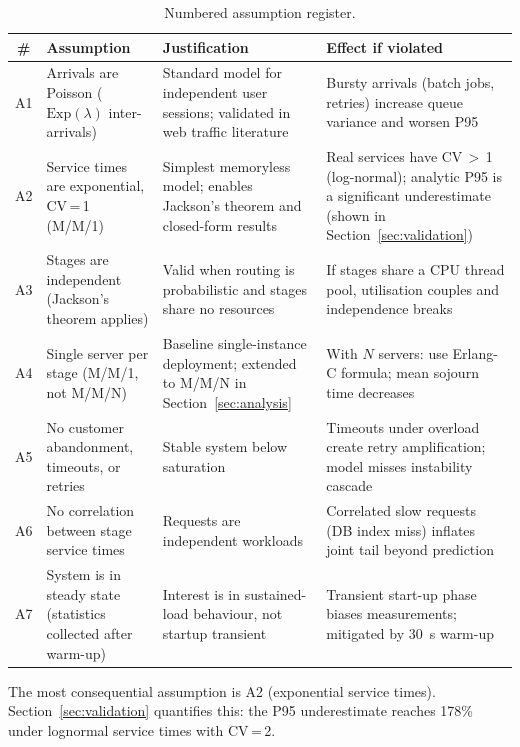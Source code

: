 \documentclass[12pt,a4paper]{article}
\newcommand{\Exp}[1]{\mathrm{Exp}(#1)}
\begin{document}
\begin{table}[H]
\centering
\caption{Numbered assumption register.}
\label{tab:assumptions}
\small
\begin{tabular}{cp{4.4cm}p{3.6cm}p{3.8cm}}
\toprule
\# & Assumption & Justification & Effect if violated \\
\midrule
A1 & Arrivals are Poisson ($\Exp{\lambda}$ inter-arrivals) &
     Standard model for independent user sessions; validated in web traffic literature &
     Bursty arrivals (batch jobs, retries) increase queue variance and worsen P95 \\[4pt]
A2 & Service times are exponential, CV\,=\,1 (M/M/1) &
     Simplest memoryless model; enables Jackson's theorem and closed-form results &
     Real services have CV\,$>$\,1 (log-normal); analytic P95 is a significant
     underestimate (shown in Section~\ref{sec:validation}) \\[4pt]
A3 & Stages are independent (Jackson's theorem applies) &
     Valid when routing is probabilistic and stages share no resources &
     If stages share a CPU thread pool, utilisation couples and independence breaks \\[4pt]
A4 & Single server per stage (M/M/1, not M/M/N) &
     Baseline single-instance deployment; extended to M/M/N in Section~\ref{sec:analysis} &
     With $N$ servers: use Erlang-C formula; mean sojourn time decreases \\[4pt]
A5 & No customer abandonment, timeouts, or retries &
     Stable system below saturation &
     Timeouts under overload create retry amplification; model misses instability cascade \\[4pt]
A6 & No correlation between stage service times &
     Requests are independent workloads &
     Correlated slow requests (DB index miss) inflates joint tail beyond prediction \\[4pt]
A7 & System is in steady state (statistics collected after warm-up) &
     Interest is in sustained-load behaviour, not startup transient &
     Transient start-up phase biases measurements; mitigated by \SI{30}{s} warm-up \\
\bottomrule
\end{tabular}
\end{table}

The most consequential assumption is A2 (exponential service times). Section~\ref{sec:validation}
quantifies this: the P95 underestimate reaches 178\% under lognormal service times with CV\,=\,2.

\end{document}
